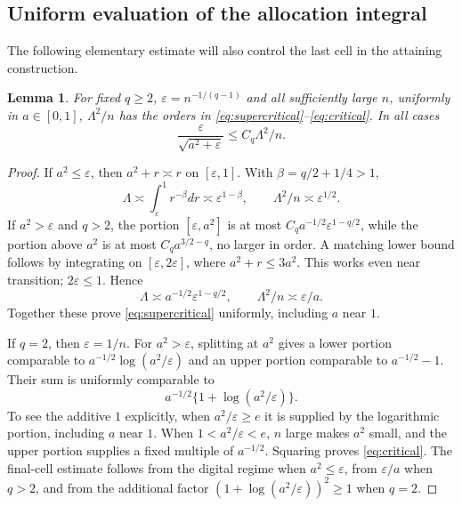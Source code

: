 \documentclass[11pt,a4paper]{amsart}
\theoremstyle{plain}
\newtheorem{lemma}[theorem]{Lemma}
\theoremstyle{definition}
\theoremstyle{remark}
\newcommand{\eps}{\varepsilon}
\begin{document}
\subsection{Uniform evaluation of the allocation integral}
The following elementary estimate will also control the last cell in the attaining construction.
\begin{lemma}\label{lem:integral}
For fixed $q\ge2$, $\eps=n^{-1/(q-1)}$ and all sufficiently large $n$, uniformly in $a\in[0,1]$, $\Lambda^2/n$ has the orders in \eqref{eq:supercritical}--\eqref{eq:critical}. In all cases
\begin{equation}\label{eq:final-cell-bound}
 \frac{\eps}{\sqrt{a^2+\eps}}\le C_q\Lambda^2/n.
\end{equation}
\end{lemma}
\begin{proof}
If $a^2\le\eps$, then $a^2+r\asymp r$ on $[\eps,1]$. With $\beta=q/2+1/4>1$,
\[
 \Lambda\asymp\int_\eps^1r^{-\beta}dr\asymp\eps^{1-\beta},
 \qquad \Lambda^2/n\asymp\eps^{1/2}.
\]
If $a^2>\eps$ and $q>2$, the portion $[\eps,a^2]$ is at most
$C_q a^{-1/2}\eps^{1-q/2}$, while the portion above $a^2$ is at most $C_q a^{3/2-q}$, no larger in order. A matching lower bound follows by integrating on $[\eps,2\eps]$, where $a^2+r\le3a^2$. This works even near transition; $2\eps\le1$. Hence
\[
 \Lambda\asymp a^{-1/2}\eps^{1-q/2},\qquad
 \Lambda^2/n\asymp\eps/a.
\]
Together these prove \eqref{eq:supercritical} uniformly, including $a$ near $1$.

If $q=2$, then $\eps=1/n$. For $a^2>\eps$, splitting at $a^2$ gives a lower portion comparable to
$a^{-1/2}\log(a^2/\eps)$ and an upper portion comparable to $a^{-1/2}-1$. Their sum is uniformly comparable to
\begin{equation}\label{eq:critical-integral}
 a^{-1/2}\{1+\log(a^2/\eps)\}.
\end{equation}
To see the additive $1$ explicitly, when $a^2/\eps\ge e$ it is supplied by the logarithmic portion, including $a$ near $1$. When $1<a^2/\eps<e$, $n$ large makes $a^2$ small, and the upper portion supplies a fixed multiple of $a^{-1/2}$. Squaring proves \eqref{eq:critical}. The final-cell estimate follows from the digital regime when $a^2\le\eps$, from $\eps/a$ when $q>2$, and from the additional factor $(1+\log(a^2/\eps))^2\ge1$ when $q=2$.
\end{proof}
\end{document}

